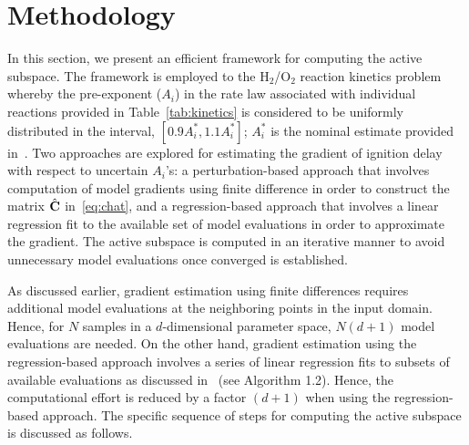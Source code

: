 \section{Methodology}
\label{sec:method}

In this section, we present an efficient framework for computing the
active subspace. The framework is employed to the H$_2$/O$_2$ reaction kinetics
problem whereby the 
pre-exponent ($A_i$) in the rate law associated with individual reactions provided in
Table~\ref{tab:kinetics} is considered to be uniformly
distributed in the interval, $[0.9A_i^\ast, 1.1A_i^\ast]$; $A_i^\ast$ is the nominal
estimate provided in~\cite{Yetter:1991}.
Two approaches are explored for estimating the gradient of ignition delay with
respect to uncertain $A_i$'s: 
a perturbation-based approach that involves computation of model
gradients using finite difference in order to construct the matrix $\hat{\mathbf{{C}}}$
in~\eqref{eq:chat}, and a regression-based approach 
that involves a linear regression fit to the available set of
model evaluations in order to approximate the gradient. 
The active subspace is computed in an iterative manner to avoid
unnecessary model evaluations once converged is established.


As discussed earlier, gradient estimation using finite differences 
requires additional model evaluations at the
neighboring points in the input domain. 
Hence, for $N$ samples in a $d$-dimensional parameter space, $N(d+1)$
model evaluations are needed. On the other hand, gradient estimation
using the regression-based approach involves a series of linear regression
fits to subsets of available evaluations as discussed 
in~\cite{Constantine:2015} (see Algorithm 1.2). Hence, the computational effort is  
reduced by a factor $(d+1)$ when using the regression-based approach.
The specific sequence of steps
for computing the active subspace is discussed as follows.   

